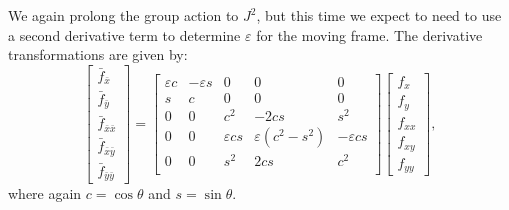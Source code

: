 \documentclass[review,onefignum,onetabnum]{siamonline190516}
\begin{document}
{We again prolong the group action to $J^2$, but this time we expect to need
to use a second derivative term to determine $\varepsilon$ for the moving
frame. The derivative transformations are given by:
\begin{equation}
  \begin{bmatrix}
  \bar f_{\bar x} \\ \bar f_{\bar y} \\ \bar f_{\bar{x}\bar{x}} \\ \bar f_{\bar{x}\bar{y}} \\ \bar f_{\bar{y}\bar{y}}
  \end{bmatrix} = 
  \begin{bmatrix}
 \varepsilon c & -\varepsilon s & 0 & 0 & 0 \\
 s & c & 0 & 0 & 0 \\
0 & 0 & c^2 & -2cs & s^2 \\
0 & 0 & \varepsilon cs & \varepsilon(c^2 - s^2) & -\varepsilon cs \\
0 & 0 & s^2 & 2cs & c^2 \\
  \end{bmatrix}
  \begin{bmatrix}
f_x \\ f_y \\ f_{xx} \\ f_{xy} \\ f_{yy} 
  \end{bmatrix},
\label{eqn:E2prolongation}
\end{equation}
where again $c = \cos\theta$ and $s = \sin\theta$.  

}
\end{document}

